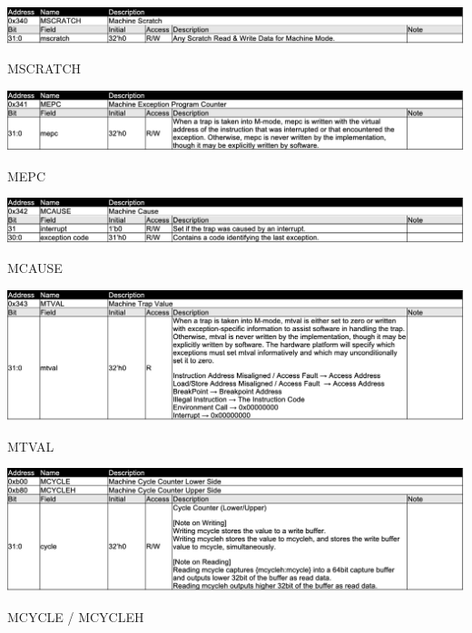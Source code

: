 \begin{table}[H]
    \includegraphics[width=1.00\columnwidth]{./Table/MSCRATCH.png}
    \caption{MSCRATCH}
    \label{tb:MSCRATCH}
\end{table}

\begin{table}[H]
    \includegraphics[width=1.00\columnwidth]{./Table/MEPC.png}
    \caption{MEPC}
    \label{tb:MEPC}
\end{table}

\begin{table}[H]
    \includegraphics[width=1.00\columnwidth]{./Table/MCAUSE.png}
    \caption{MCAUSE}
    \label{tb:MCAUSE}
\end{table}

\begin{table}[H]
    \includegraphics[width=1.00\columnwidth]{./Table/MTVAL.png}
    \caption{MTVAL}
    \label{tb:MTVAL}
\end{table}

\begin{table}[H]
    \includegraphics[width=1.00\columnwidth]{./Table/MCYCLE.png}
    \caption{MCYCLE / MCYCLEH}
    \label{tb:MCYCLE}
\end{table}

